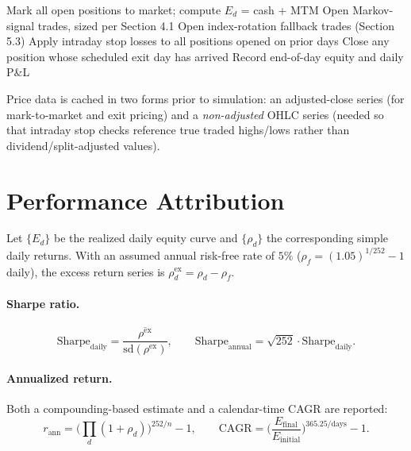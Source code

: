 \documentclass[11pt]{article}
\begin{document}
\begin{algorithm}[h]
\caption{Daily backtest loop}
\label{alg:loop}
\begin{algorithmic}[1]
  \State Mark all open positions to market; compute $E_d$ = cash + MTM
    \State Open Markov-signal trades, sized per Section 4.1
  \Else
    \State Open index-rotation fallback trades (Section 5.3)
  \EndIf
  \State Apply intraday stop losses to all positions opened on prior days
  \State Close any position whose scheduled exit day has arrived
  \State Record end-of-day equity and daily P\&L
\EndFor
\end{algorithmic}
\end{algorithm}

Price data is cached in two forms prior to simulation: an
adjusted-close series (for mark-to-market and exit pricing) and a
\emph{non-adjusted} OHLC series (needed so that intraday stop checks
reference true traded highs/lows rather than dividend/split-adjusted
values).

\section{Performance Attribution}

Let $\{E_d\}$ be the realized daily equity curve and $\{\rho_d\}$ the
corresponding simple daily returns. With an assumed annual risk-free rate
of $5\%$ ($\rho_f = (1.05)^{1/252} - 1$ daily), the excess return series is
$\rho_d^{\text{ex}} = \rho_d - \rho_f$.

\paragraph{Sharpe ratio.}
\[
  \text{Sharpe}_{\text{daily}} = \frac{\overline{\rho^{\text{ex}}}}{\text{sd}(\rho^{\text{ex}})},
  \qquad
  \text{Sharpe}_{\text{annual}} = \sqrt{252}\cdot \text{Sharpe}_{\text{daily}}.
\]

\paragraph{Annualized return.} Both a compounding-based estimate and a
calendar-time CAGR are reported:
\[
  r_{\text{ann}} = \Big(\prod_d (1+\rho_d)\Big)^{252/n} - 1,
  \qquad
  \text{CAGR} = \Big(\frac{E_{\text{final}}}{E_{\text{initial}}}\Big)^{365.25/\text{days}} - 1.
\]
\end{document}
